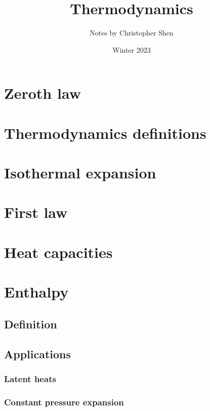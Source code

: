 \documentclass{article}
\title{Thermodynamics}
\author{Notes by Christopher Shen}
\date{Winter 2023}
\begin{document}
\maketitle
\newpage

\tableofcontents
\newpage

\pagestyle{fancy}
\fancyhead{}

\section{Zeroth law}


\section{Thermodynamics definitions}


\section{Isothermal expansion}


\section{First law}

\newpage

\section{Heat capacities}

\newpage

\section{Enthalpy}

\subsection{Definition}

\subsection{Applications}

\subsubsection{Latent heats}

\subsubsection{Constant pressure expansion}
\end{document}
